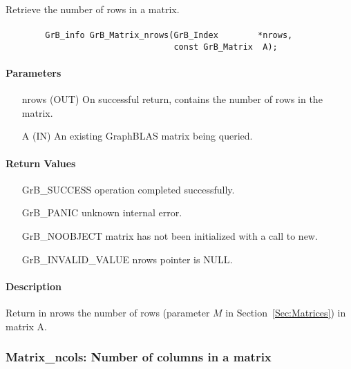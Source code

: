 Retrieve the number of rows in a matrix.

\paragraph{\syntax}

\begin{verbatim}
        GrB_info GrB_Matrix_nrows(GrB_Index        *nrows,
                                  const GrB_Matrix  A);
\end{verbatim}

\paragraph{Parameters}

\begin{itemize}[leftmargin=1.1in]
    \item[{\sf nrows}] ({\sf OUT}) On successful return, contains the number of rows in the matrix.
    \item[{\sf A}] ({\sf IN}) An existing GraphBLAS matrix being queried.
\end{itemize}


\paragraph{Return Values}

\begin{itemize}[leftmargin=2.1in]
\item[{\sf GrB\_SUCCESS}]   operation completed successfully.
\item[{\sf GrB\_PANIC}]     unknown internal error.
\item[{\sf GrB\_NOOBJECT}]  matrix has not been initialized with a call to {\sf new}.
\item[{\sf GrB\_INVALID\_VALUE}]    {\sf nrows} pointer is {\sf NULL}.
\end{itemize}

\paragraph{Description}

Return in {\sf nrows} the number of rows (parameter $M$ in Section~\ref{Sec:Matrices}) in matrix {\sf A}.

\subsubsection{{\sf Matrix\_ncols}: Number of columns in a matrix}

